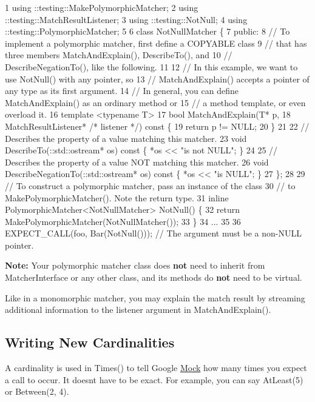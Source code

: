 \begin{DoxyCode}
1 using ::testing::MakePolymorphicMatcher;
2 using ::testing::MatchResultListener;
3 using ::testing::NotNull;
4 using ::testing::PolymorphicMatcher;
5 
6 class NotNullMatcher \{
7  public:
8   // To implement a polymorphic matcher, first define a COPYABLE class
9   // that has three members MatchAndExplain(), DescribeTo(), and
10   // DescribeNegationTo(), like the following.
11 
12   // In this example, we want to use NotNull() with any pointer, so
13   // MatchAndExplain() accepts a pointer of any type as its first argument.
14   // In general, you can define MatchAndExplain() as an ordinary method or
15   // a method template, or even overload it.
16   template <typename T>
17   bool MatchAndExplain(T* p,
18                        MatchResultListener* /* listener */) const \{
19     return p != NULL;
20   \}
21 
22   // Describes the property of a value matching this matcher.
23   void DescribeTo(::std::ostream* os) const \{ *os << "is not NULL"; \}
24 
25   // Describes the property of a value NOT matching this matcher.
26   void DescribeNegationTo(::std::ostream* os) const \{ *os << "is NULL"; \}
27 \};
28 
29 // To construct a polymorphic matcher, pass an instance of the class
30 // to MakePolymorphicMatcher().  Note the return type.
31 inline PolymorphicMatcher<NotNullMatcher> NotNull() \{
32   return MakePolymorphicMatcher(NotNullMatcher());
33 \}
34 ...
35 
36   EXPECT\_CALL(foo, Bar(NotNull()));  // The argument must be a non-NULL pointer.
\end{DoxyCode}


{\bfseries Note\+:} Your polymorphic matcher class does {\bfseries not} need to inherit from {\ttfamily Matcher\+Interface} or any other class, and its methods do {\bfseries not} need to be virtual.

Like in a monomorphic matcher, you may explain the match result by streaming additional information to the {\ttfamily listener} argument in {\ttfamily Match\+And\+Explain()}.

\subsection*{Writing New Cardinalities}

A cardinality is used in {\ttfamily Times()} to tell Google \hyperlink{class_mock}{Mock} how many times you expect a call to occur. It doesn\textquotesingle{}t have to be exact. For example, you can say {\ttfamily At\+Least(5)} or {\ttfamily Between(2, 4)}.

